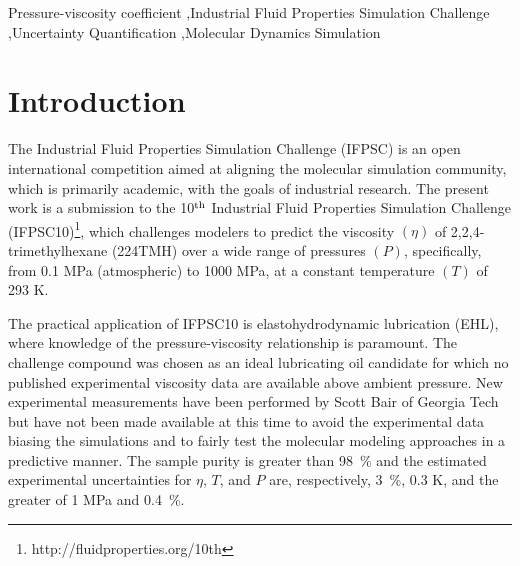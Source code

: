 \documentclass[preprint,review,12pt]{elsarticle}
\begin{document}
\begin{frontmatter}
\begin{abstract}
		\end{abstract}
		
		\begin{keyword}
			
			
			
			Pressure-viscosity coefficient \sep Industrial Fluid Properties Simulation Challenge \sep Uncertainty Quantification \sep Molecular Dynamics Simulation
			
		\end{keyword}
		
	\end{frontmatter}	
		
	\section{Introduction}
	
	The Industrial Fluid Properties Simulation Challenge (IFPSC) is an open international competition aimed at aligning the molecular simulation community, which is primarily academic, with the goals of industrial research. The present work is a submission to the 10$^{\rm th}$ Industrial Fluid Properties Simulation Challenge (IFPSC10)\footnote{http://fluidproperties.org/10th}, which challenges modelers to predict the viscosity $(\eta)$ of 2,2,4-trimethylhexane (224TMH) over a wide range of pressures $(P)$, specifically, from 0.1 MPa (atmospheric) to 1000 MPa, at a constant temperature $(T)$ of 293 K.
	
    The practical application of IFPSC10 is elastohydrodynamic lubrication (EHL), where knowledge of the pressure-viscosity relationship is paramount. The challenge compound was chosen as an ideal lubricating oil candidate for which no published experimental viscosity data are available above ambient pressure. New experimental measurements have been performed by Scott Bair of Georgia Tech but have not been made available at this time to avoid the experimental data biasing the simulations and to fairly test the molecular modeling approaches in a predictive manner. The sample purity is greater than 98~\% and the estimated experimental uncertainties for $\eta$, $T$, and $P$ are, respectively, 3~\%, 0.3 K, and the greater of 1 MPa and 0.4~\%.
	
\end{document}

